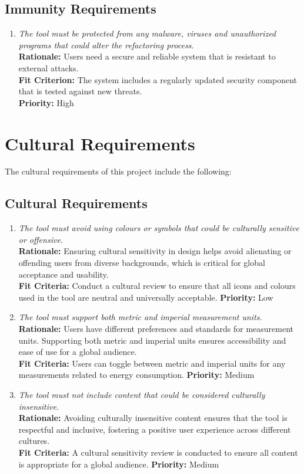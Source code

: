 \documentclass[12pt]{article}
\begin{document}
\subsection{Immunity Requirements}
\begin{enumerate}[label=SR-AUR \arabic*., wide=0pt, leftmargin=*]
	\item \emph{The tool must be protected from any malware, viruses and unauthorized programs that could alter the refactoring process. }\\[2mm]
    {\bf Rationale:} Users need a secure and reliable system that is resistant to external attacks.\\
    {\bf Fit Criterion:} The system includes a regularly updated security component that is tested against new threats.\\
    {\bf Priority:} High
\end{enumerate}

\section{Cultural Requirements}
The cultural requirements of this project include the following:
\subsection{Cultural Requirements}
\begin{enumerate}[label=CULT \arabic*., wide=0pt, leftmargin=*]
  \item \emph{The tool must avoid using colours or symbols that could be culturally sensitive or offensive.}\\
  {\bf Rationale:} Ensuring cultural sensitivity in design helps avoid alienating or offending users from diverse backgrounds, which is critical for global acceptance and usability.\\
  {\bf Fit Criteria:} Conduct a cultural review to ensure that all icons and colours used in the tool are neutral and universally acceptable.
  {\bf Priority:} Low

  \item \emph{The tool must support both metric and imperial measurement units.}\\
  {\bf Rationale:} Users have different preferences and standards for measurement units. Supporting both metric and imperial units ensures accessibility and ease of use for a global audience.\\
  {\bf Fit Criteria:} Users can toggle between metric and imperial units for any measurements related to energy consumption.
  {\bf Priority:} Medium

  \item \emph{The tool must not include content that could be considered culturally insensitive.}\\
  {\bf Rationale:} Avoiding culturally insensitive content ensures that the tool is respectful and inclusive, fostering a positive user experience across different cultures.\\
  {\bf Fit Criteria:} A cultural sensitivity review is conducted to ensure all content is appropriate for a global audience.
  {\bf Priority:} Medium

\end{enumerate}
\end{document}
